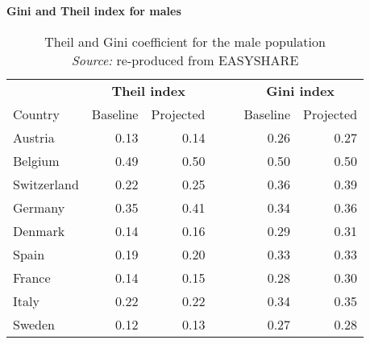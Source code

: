 \begin{table}[H]
    \centering  \textbf{Gini and Theil index for males}\par\medskip\medskip
\begin{tabular}{lrrrrrr}
\midrule
 &    \multicolumn{2}{c}{\textbf{Theil index}}  & &&   \multicolumn{2}{c}{\textbf{Gini index}}  \\
Country &  Baseline &  Projected & && Baseline &  Projected \\
\toprule
      Austria &           0.13 &       0.14  && &          0.26 &       0.27 \\
      Belgium &           0.49 &       0.50 &  &  &       0.50 &       0.50 \\
  Switzerland &           0.22 &       0.25 &  & &        0.36 &       0.39 \\
      Germany &           0.35 &       0.41 &  &  &       0.34 &       0.36 \\
     Denmark &           0.14 &       0.16 &   &   &     0.29 &       0.31 \\
       Spain &           0.19 &       0.20 &  &     &    0.33 &       0.33 \\
      France &           0.14 &       0.15 &  &      &   0.28 &       0.30 \\
       Italy &           0.22 &       0.22 &  &       &  0.34 &       0.35 \\
      Sweden &           0.12 &       0.13 &  &       &  0.27 &       0.28 \\
\bottomrule
\end{tabular}
\captionsetup{justification=centering}
 \caption{Theil and Gini coefficient for the male population\\ 
 \textit{Source:} re-produced from EASYSHARE }
    \label{tab:ginitheil_male}
\end{table}



